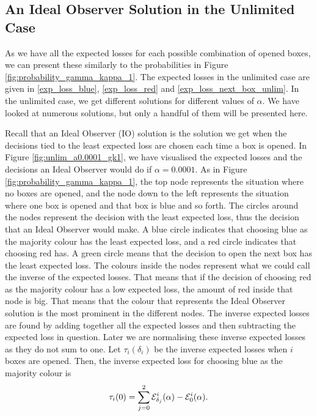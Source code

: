 \subsection{An Ideal Observer Solution in the Unlimited Case}

As we have all the expected losses for each possible combination of opened boxes, we can present these similarly to the probabilities in Figure \ref{fig:probability_gamma_kappa_1}. 
The expected losses in the unlimited case are given in \eqref{exp_loss_blue}, \eqref{exp_loss_red} and \eqref{exp_loss_next_box_unlim}. In the unlimited case, we get different solutions for different values of $\alpha$. We have looked at numerous solutions, but only a handful of them will be presented here. 

Recall that an Ideal Observer (IO) solution is the solution we get when the decisions tied to the least expected loss are chosen each time a box is opened. In Figure \ref{fig:unlim_a0.0001_gk1}, we have visualised the expected losses and the decisions an Ideal Observer would do if $\alpha=0.0001$. As in Figure \ref{fig:probability_gamma_kappa_1}, the top node represents the situation where no boxes are opened, and the node down to the left represents the situation where one box is opened and that box is blue and so forth. The circles around the nodes represent the decision with the least expected loss, thus the decision that an Ideal Observer would make. A blue circle indicates that choosing blue as the majority colour has the least expected loss, and a red circle indicates that choosing red has. A green circle means that the decision to open the next box has the least expected loss. The colours inside the nodes represent what we could call the inverse of the expected losses. That means that if the decision of choosing red as the majority colour has a low expected loss, the amount of red inside that node is big. That means that the colour that represents the Ideal Observer solution is the most prominent in the different nodes. The inverse expected losses are found by adding together all the expected losses and then subtracting the expected loss in question. Later we are normalising these inverse expected losses as they do not sum to one. Let $\tau_i(\delta_i)$ be the inverse expected losses when $i$ boxes are opened. Then, the inverse expected loss for choosing blue as the majority colour is 
\begin{equation*}
    \tau_i(0) = \sum_{j=0}^2 \mathcal{E}_{\delta_j}^i(\alpha) - \mathcal{E}_0^i(\alpha).
\end{equation*}
